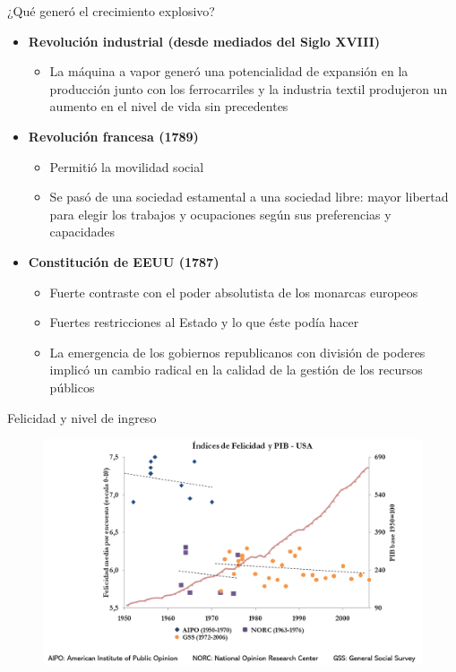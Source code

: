 \documentclass{beamer}
\begin{document}
\begin{frame}{¿Qué generó el crecimiento explosivo?}
    \begin{itemize}
    \item \textbf{Revolución industrial (desde mediados del Siglo XVIII)}
    \begin{itemize}
        \item La máquina a vapor generó una potencialidad de expansión en la producción junto con los ferrocarriles y la industria textil produjeron un aumento en el nivel de vida sin precedentes
    \end{itemize}
    
    \item \textbf{Revolución francesa (1789)}
    \begin{itemize}
        \item Permitió la movilidad social
        \item Se pasó de una sociedad estamental a una sociedad libre: mayor libertad para elegir los trabajos y ocupaciones según sus preferencias y capacidades
    \end{itemize}
     \item \textbf{Constitución de EEUU (1787)}
     \begin{itemize}
        \item Fuerte contraste con el poder absolutista de los monarcas europeos
        \item Fuertes restricciones al Estado y lo que éste podía hacer
        \item La emergencia de los gobiernos republicanos con división de poderes implicó un cambio radical en la calidad de la gestión de los recursos públicos
    \end{itemize}
\end{itemize}
\end{frame}

\begin{frame}{Felicidad y nivel de ingreso}
    \begin{figure} [H]   \includegraphics[scale=0.5]{Figures/C17.2.png}
\end{figure}
\end{frame}
\end{document}
